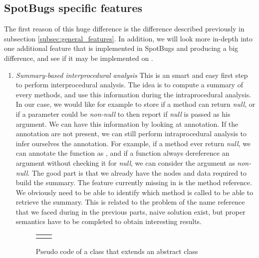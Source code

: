 \subsection{SpotBugs specific features}
\label{subsec:spotbugs_specific}

The first reason of this huge difference is the difference described previously in subsection \ref{subsec:general_features}.
In addition, we will look more in-depth into one additional feature that is implemented in SpotBugs and producing a big difference, and see if it may be implemented on \slang{}.

\begin{enumerate}
	\item \textit{Summary-based interprocedural analysis} \newline
	This is an smart and easy first step to perform interprocedural analysis.
	The idea is to compute a summary of every methods, and use this information during the intraprocedural analysis. 
	In our case, we would like for example to store if a method can return \emph{null}, or if a parameter could be \emph{non-null} to then report if \emph{null} is passed as his argument. 
	We can have this information by looking at annotation.
	If the annotation are not present, we can still perform intraprocedural analysis to infer ourselves the annotation. 
	For example, if a method ever return \emph{null}, we can annotate the function as \nullable{}, and if a function always dereference an argument without checking it for \emph{null}, we can consider the argument as \emph{non-null}. 
	The good part is that we already have the nodes and data required to build the summary. 
	The feature currently missing in \slang{} is the method reference. 
	We obviously need to be able to identify which method is called to be able to retrieve the summary.
	This is related to the problem of the name reference that we faced during in the previous parts, naive solution exist, but proper semantics have to be completed to obtain interesting results.


\begin{figure}[h]
	\centering
	\caption{Pseudo code of a class that extends an abstract class}
	\label{figure:class-extends-abtract}
	\setlength{\tabcolsep}{24pt}
	\begin{tabular}{cc}
		\multicolumn{1}{c}{} & \multicolumn{1}{c}{} \\
	\end{tabular}
\end{figure}
	

\end{enumerate}
